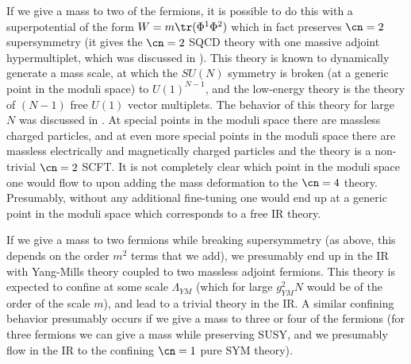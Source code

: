  If we give a mass to two of the fermions, it is possible to do this
 with a superpotential of the form $W = m\tr(\Phi^1 \Phi^2)$ which in
 fact preserves $\cn=2$ supersymmetry (it gives the $\cn=2$ SQCD
 theory with one massive adjoint hypermultiplet, which was discussed
 in \cite{Donagi:1996cf}). This theory is known to dynamically
 generate a mass scale, at which the $SU(N)$ symmetry is broken (at a
 generic point in the moduli space) to $U(1)^{N-1}$, and the
 low-energy theory is the theory of $(N-1)$ free $U(1)$ vector
 multiplets. The behavior of this theory for large $N$ was discussed
 in \cite{Douglas:1995nw}. At special points in the moduli space there
 are massless charged particles, and at even more special points in
 the moduli space \cite{Argyres:1995jj,Argyres:1996xn,Eguchi:1996vu}
 there are massless electrically and magnetically charged particles
 and the theory is a non-trivial $\cn=2$ SCFT. It is not completely
 clear which point in the moduli space one would flow to upon adding
 the mass deformation to the $\cn=4$ theory. Presumably, without any
 additional fine-tuning one would end up at a generic point in the
 moduli space which corresponds to a free IR theory.

 If we give a mass to two fermions while breaking supersymmetry (as
 above, this depends on the order $m^2$ terms that we add), we
 presumably end up in the IR with Yang-Mills theory coupled to two
 massless adjoint fermions. This theory is expected to confine at some
 scale $\Lambda_{YM}$ (which for large $g_{YM}^2 N$ would be of the
 order of the scale $m$), and lead to a trivial theory in the IR. A
 similar confining behavior presumably occurs if we give a mass to
 three or four of the fermions (for three fermions we can give a mass
 while preserving SUSY, and we presumably flow in the IR to the
 confining $\cn=1$ pure SYM theory).

